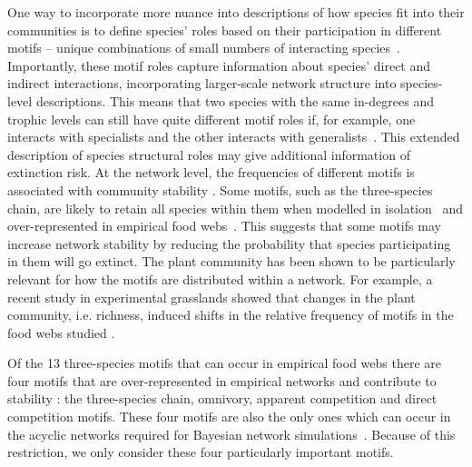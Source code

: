 \documentclass[12pt]{article}
\begin{document}
\begin{spacing}{2.0}
    
    One way to incorporate more nuance into descriptions of how species fit into their communities is to define species' roles based on their participation in different motifs -- unique combinations of small numbers of interacting species~\citep{Stouffer2007,Stouffer2012}. Importantly, these motif roles capture information about species' direct and indirect interactions, incorporating larger-scale network structure into species-level descriptions. 
    This means that two species with the same in-degrees and trophic levels can still have quite different motif roles if, for example, one interacts with specialists and the other interacts with generalists~\citep{Cirtwill2018FoodWebs}. This extended description of species structural roles may give additional information of extinction risk. 
    At the network level, the frequencies of different motifs is associated with community stability \citep{prill2005dynamic, bascompte2005simple}.
    Some motifs, such as the three-species chain, are likely to retain all species within them when modelled in isolation~\citep{Borrelli2015a} and over-represented in empirical food webs~\citep{Stouffer2007}.
    This suggests that some motifs may increase network stability by reducing the probability that species participating in them will go extinct.
    The plant community has been shown to be particularly relevant for how the motifs are distributed within a network. For example, a recent study in experimental grasslands showed that changes in the plant community, i.e. richness, induced shifts in the relative frequency of motifs in the food webs studied \cite{giling2019plant}. 
    
    Of the 13 three-species motifs that can occur in empirical food webs there are four motifs that are over-represented in empirical networks \citep{Stouffer2007} and contribute to stability \citep{Stouffer2007, Borrelli2015a, giling2019plant}: the three-species chain, omnivory, apparent competition and direct competition motifs.
    These four motifs are also the only ones which can occur in the acyclic networks required for Bayesian network simulations~\citep{Eklof2013}. Because of this restriction, we only consider these four particularly important motifs.  
    


\end{spacing}
\end{document}
